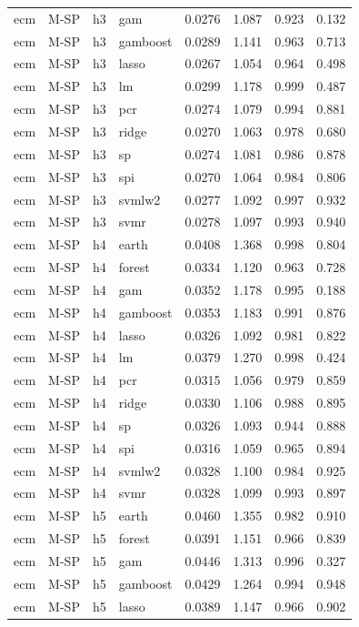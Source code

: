 \begin{ThreePartTable}
\begin{longtable}[t]{llclcccc}
ecm & M-SP & h3 & gam & 0.0276 & 1.087 & 0.923 & 0.132\\
ecm & M-SP & h3 & gamboost & 0.0289 & 1.141 & 0.963 & 0.713\\
ecm & M-SP & h3 & lasso & 0.0267 & 1.054 & 0.964 & 0.498\\
ecm & M-SP & h3 & lm & 0.0299 & 1.178 & 0.999 & 0.487\\
ecm & M-SP & h3 & pcr & 0.0274 & 1.079 & 0.994 & 0.881\\
ecm & M-SP & h3 & ridge & 0.0270 & 1.063 & 0.978 & 0.680\\
ecm & M-SP & h3 & sp & 0.0274 & 1.081 & 0.986 & 0.878\\
ecm & M-SP & h3 & spi & 0.0270 & 1.064 & 0.984 & 0.806\\
ecm & M-SP & h3 & svmlw2 & 0.0277 & 1.092 & 0.997 & 0.932\\
ecm & M-SP & h3 & svmr & 0.0278 & 1.097 & 0.993 & 0.940\\
\addlinespace
ecm & M-SP & h4 & earth & 0.0408 & 1.368 & 0.998 & 0.804\\
ecm & M-SP & h4 & forest & 0.0334 & 1.120 & 0.963 & 0.728\\
ecm & M-SP & h4 & gam & 0.0352 & 1.178 & 0.995 & 0.188\\
ecm & M-SP & h4 & gamboost & 0.0353 & 1.183 & 0.991 & 0.876\\
ecm & M-SP & h4 & lasso & 0.0326 & 1.092 & 0.981 & 0.822\\
ecm & M-SP & h4 & lm & 0.0379 & 1.270 & 0.998 & 0.424\\
ecm & M-SP & h4 & pcr & 0.0315 & 1.056 & 0.979 & 0.859\\
ecm & M-SP & h4 & ridge & 0.0330 & 1.106 & 0.988 & 0.895\\
ecm & M-SP & h4 & sp & 0.0326 & 1.093 & 0.944 & 0.888\\
ecm & M-SP & h4 & spi & 0.0316 & 1.059 & 0.965 & 0.894\\
ecm & M-SP & h4 & svmlw2 & 0.0328 & 1.100 & 0.984 & 0.925\\
ecm & M-SP & h4 & svmr & 0.0328 & 1.099 & 0.993 & 0.897\\
\addlinespace
ecm & M-SP & h5 & earth & 0.0460 & 1.355 & 0.982 & 0.910\\
ecm & M-SP & h5 & forest & 0.0391 & 1.151 & 0.966 & 0.839\\
ecm & M-SP & h5 & gam & 0.0446 & 1.313 & 0.996 & 0.327\\
ecm & M-SP & h5 & gamboost & 0.0429 & 1.264 & 0.994 & 0.948\\
ecm & M-SP & h5 & lasso & 0.0389 & 1.147 & 0.966 & 0.902\\

\end{longtable}
\end{ThreePartTable}
